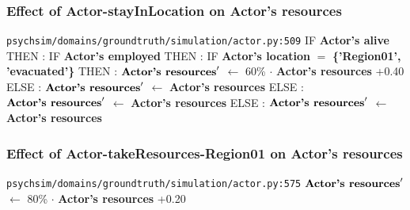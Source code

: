 \documentclass{article}%
\begin{document}
\subsubsection{Effect of Actor{-}stayInLocation on Actor's resources}%
\label{ssubsec:Effect of Actor{-}stayInLocation on Actor's resources}%
\begin{flushleft}%
\verb|psychsim/domains/groundtruth/simulation/actor.py:509|%
\linebreak%
IF %
\textbf{Actor's alive}%
\linebreak%
\hspace*{2em}%
THEN %
: %
IF %
\textbf{Actor's employed}%
\linebreak%
\hspace*{4em}%
THEN %
: %
IF %
\textbf{Actor's location}%
$=$%
\textbf{\{'Region01', 'evacuated'\}}%
\linebreak%
\hspace*{6em}%
THEN %
: %
$\mbox{\textbf{Actor's resources}} '$%
$\leftarrow$%
60\%%
$\cdot$%
\textbf{Actor's resources}%
+0.40%
\linebreak%
\hspace*{6em}%
ELSE %
: %
$\mbox{\textbf{Actor's resources}} '$%
$\leftarrow$%
\textbf{Actor's resources}%
\linebreak%
\hspace*{4em}%
ELSE %
: %
$\mbox{\textbf{Actor's resources}} '$%
$\leftarrow$%
\textbf{Actor's resources}%
\linebreak%
\hspace*{2em}%
ELSE %
: %
$\mbox{\textbf{Actor's resources}} '$%
$\leftarrow$%
\textbf{Actor's resources}%
\end{flushleft}

%
\subsubsection{Effect of Actor{-}takeResources{-}Region01 on Actor's resources}%
\label{ssubsec:Effect of Actor{-}takeResources{-}Region01 on Actor's resources}%
\begin{flushleft}%
\verb|psychsim/domains/groundtruth/simulation/actor.py:575|%
\linebreak%
$\mbox{\textbf{Actor's resources}} '$%
$\leftarrow$%
80\%%
$\cdot$%
\textbf{Actor's resources}%
+0.20%
\end{flushleft}

%
\end{document}
